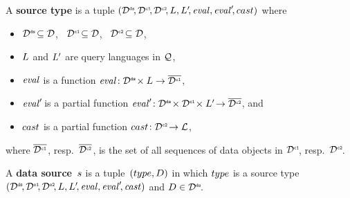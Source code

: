 \vspace{-1mm} %

\begin{definition}
	\label{def:source_type}
	\normalfont
	A \textbf{source type} is a tuple $(\mathcal{D}^\texttt{\tiny ds}\!, \mathcal{D}^\texttt{\tiny c1}\!, \mathcal{D}^\texttt{\tiny c2}\!, L, L'\!, \mathit{eval}, \mathit{eval}'\!, cast)$
	where%
\vspace{-2mm} %
	\begin{itemize}
		\item
		      $\mathcal{D}^\texttt{\tiny ds}\! \subseteq \mathcal{D}$,
		      \, $\mathcal{D}^\texttt{\tiny c1}\! \subseteq \mathcal{D}$,
		      \, $\mathcal{D}^\texttt{\tiny c2}\! \subseteq \mathcal{D}$,

		\item
		      $L$ and $L'$ are query languages in $\mathcal{Q}$,

		\item
		      $\mathit{eval}$ is a function $\mathit{eval} \!: \mathcal{D}^\texttt{\tiny ds}\! \times L \rightarrow \overline{\mathcal{D}^\texttt{\tiny c1}}$,

		\item
		      $\mathit{eval}'\!$ is a partial function $\mathit{eval}'\! : \mathcal{D}^\texttt{\tiny ds}\! \times \mathcal{D}^\texttt{\tiny c1}\! \times L'\! \rightarrow \overline{\mathcal{D}^\texttt{\tiny c2}}$, and

		\item
		      $cast$ is a partial function $cast \!: \mathcal{D}^\texttt{\tiny c2}\! \rightarrow \mathcal{L}$,
	\end{itemize}
\vspace{-2mm} %
	where $\overline{\mathcal{D}^\texttt{\tiny c1}}$, resp.\ $\overline{\mathcal{D}^\texttt{\tiny c2}}$, is the set of all
	sequences of data objects in $\mathcal{D}^\texttt{\tiny c1}\!$, resp.\ $\mathcal{D}^\texttt{\tiny c2}\!$.
\end{definition}

\vspace{-4mm} %

\begin{definition}
	\label{def:data_source}
	\normalfont
	A \textbf{data source}~$s$ is a tuple~$(type,D)$ in which
	$type$ is a source type
	$(\mathcal{D}^\texttt{\tiny ds}\!, \mathcal{D}^\texttt{\tiny o1}\!, \mathcal{D}^\texttt{\tiny o2}\!, L, L'\!, \mathit{eval}, \mathit{eval}'\!, \mathit{cast})$
	and
	$D \in \mathcal{D}^\texttt{\tiny ds}\!$.
\end{definition}

\vspace{-1mm} %

